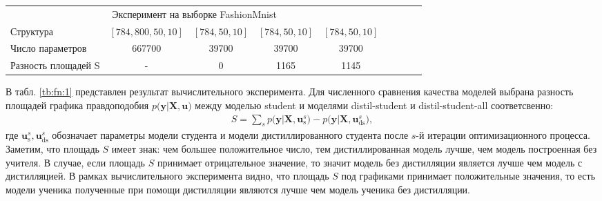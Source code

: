 \begin{table}[]
\begin{center}
{\begin{tabular}{|l|c|c|c|c|llll}
\multicolumn{5}{|c|}{Эксперимент на выборке FashionMnist}                                                     &                      &                      &                      &                      \\ \cline{1-5}
Структура           & $[784,800,50,10]$& $[784,50,10]$   & $[784,50,10]$  & $[784,50,10]$      &                      &                      &                      &                      \\ \cline{1-5}
Число параметров    &           667700                  &          39700                &         39700                &                 39700            &                      &                      &                      &                      \\ \cline{1-5}
Разность площадей S   & -                           & 0                       &  1165               & 1145                    &                      &                      &                      &                      \\ \cline{1-5}
\end{tabular}
}
\end{center}
\end{table}

В табл. \ref{tb:fn:1} представлен результат вычислительного эксперимента. Для численного сравнения качества моделей выбрана разность площадей графика правдоподобия $p\bigr(\mathbf{y}|\mathbf{X}, \mathbf{u}\bigr)$ между моделью student и моделями distil-student  и 
distil-student-all соответсвенно:
\[
\label{eq:ex:8}
\begin{aligned}
S = \sum_{s} p\bigr(\mathbf{y}|\mathbf{X}, \mathbf{u}^s_{\text{s}}\bigr) - p\bigr(\mathbf{y}|\mathbf{X}, \mathbf{u}^s_{\text{ds}}\bigr),
\end{aligned}
\]
где $\mathbf{u}^s_{\text{s}}, \mathbf{u}^s_{\text{ds}}$ обозначает параметры модели студента и модели дистиллированного студента после $s$-й итерации оптимизационного процесса. Заметим, что площадь $S$ имеет знак: чем большее положительное число, тем дистиллированная модель лучше, чем модель построенная без учителя. В случае, если площадь $S$ принимает отрицательное значение, то значит модель без дистилляции является лучше чем модель с дистилляцией. В рамках вычислительного эксперимента видно, что площадь $S$ под графиками принимает положительные значения, то есть модели ученика полученные при помощи дистилляции являются лучше чем модель ученика без дистилляции.